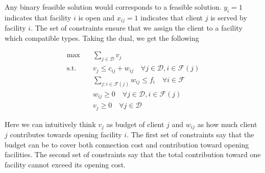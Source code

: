 Any binary feasible solution would corresponds to a feasible solution. $y_i = 1$ indicates that facility $i$ is open and $x_{ij} = 1$ indicates that client $j$ is served by facility $i$. The set of constraints ensure that we assign the client to a facility which compatible types. Taking the dual, we get the following

\begin{align}
\max \quad & \sum_{j \in \mathcal{D}} v_j \\
\text{s.t.} \quad & v_j \le c_{ij} + w_{ij} \quad \forall j \in \mathcal{D}, i \in \mathcal{F}(j)\\
& \sum_{j: i \in \mathcal{F}(j)} w_{ij} \le f_i \quad \forall i \in \mathcal{F} \\
& w_{ij} \ge 0  \quad \forall j \in \mathcal{D}, i \in \mathcal{F}(j) \label{con:facility} \\
& v_j \ge 0 \quad \forall j \in \mathcal{D}
\end{align}

Here we can intuitively think $v_j$ as budget of client $j$ and $w_{ij}$ as how much client $j$ contributes towards opening facility $i$. The first set of constraints say that the budget can be  to cover both connection cost and contribution toward opening facilities. The second set of constraints say that the total contribution toward one facility cannot exceed its opening cost.
